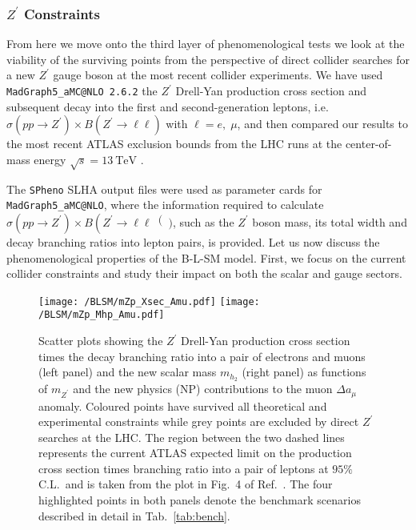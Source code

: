 \subsubsection{$Z^\prime$ Constraints}

From here we move onto the third layer of phenomenological tests  we look at the viability of the surviving points from the perspective of direct collider searches for a new $Z^\prime$ gauge boson at the most recent collider experiments.
%
We have used \texttt{MadGraph5\_aMC@NLO 2.6.2} \cite{Alwall:2014hca} the $Z^\prime$ Drell-Yan production cross section and subsequent decay into the first and second-generation leptons, i.e.~$ \sigma \left( pp \to Z^\prime \right) \times B \left( Z^\prime \to \ell \ell\right)$ with $\ell = e,\; \mu$, and then compared our results to the most recent ATLAS exclusion bounds from the LHC runs at the center-of-mass energy $\sqrt{s} = 13~\textrm{TeV}$ \cite{Aaboud:2017buh}.

The \texttt{SPheno} SLHA output files were used as parameter cards for \texttt{MadGraph5\_aMC@NLO}, where the information required to calculate $ \sigma\left(pp \to Z^\prime\right) \times B\left(Z^\prime \to \ell \ell\right()$, such as the $Z^\prime$ boson mass, its total width and decay branching ratios into lepton pairs, is provided. 
%
%
%
%
Let us now discuss the phenomenological properties of the B-L-SM model. First, we focus on the current collider constraints and study their impact on both the scalar and gauge sectors.
\begin{figure}[H]
	\centering
	\texttt{[image: /BLSM/mZp\_Xsec\_Amu.pdf]}
	\texttt{[image: /BLSM/mZp\_Mhp\_Amu.pdf]}
	\caption{Scatter plots showing the $Z^\prime$ Drell-Yan production cross section times the decay branching ratio into a pair of electrons and muons (left panel) and the new scalar mass $m_{h_2}$ (right panel) as functions of $m_{Z^\prime}$ and the new physics (NP) contributions to the muon $\Delta a_\mu$ anomaly. Coloured points have survived all theoretical and experimental constraints while grey points are excluded by direct $Z^\prime$ searches at the LHC. The region between the two dashed lines represents the current ATLAS expected limit on the production cross section times branching ratio into a pair of leptons at $95\%$ C.L.~and is taken from the plot in Fig.~4 of Ref.~\cite{Aaboud:2017buh}. The four highlighted points in both panels denote the benchmark scenarios described in detail in Tab.~\ref{tab:bench}.}
	\label{fig:Plots1}
\end{figure}	

